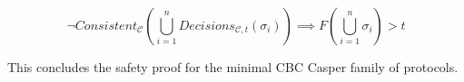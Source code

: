 \documentclass{article}
\theoremstyle{definition}
\begin{document}
$$
\neg Consistent_{\mathcal{C}}(\bigcup_{i=1}^n Decisions_{\mathcal{C},t}(\sigma_i)) \implies F(\bigcup_{i=1}^n \sigma_i) > t
$$

This concludes the safety proof for the minimal CBC Casper family of protocols.

\pagebreak


\pagebreak





\pagebreak


\iffalse





\fi
\end{document}

